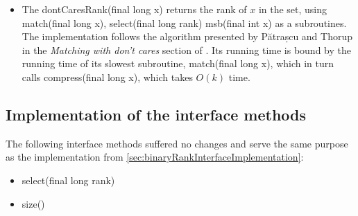 \begin{itemize}
    \item
    The {\ttfamily dontCaresRank(final long x)} returns the rank of $x$ in the set, using {\ttfamily match(final long x)}, {\ttfamily select(final long rank)} {\ttfamily msb(final int x)} as a subroutines.
    The implementation follows the algorithm presented by Pătrașcu and Thorup in the \textit{Matching with don't cares} section of \cite{patrascu2014dynamic}.
    Its running time is bound by the running time of its slowest subroutine, {\ttfamily match(final long x)}, which in turn calls {\ttfamily compress(final long x)}, which takes $O(k)$ time.

\end{itemize}

\subsection{Implementation of the interface methods} \label{sec:dontCaresRankInterfaceImplementation}

The following interface methods suffered no changes and serve the same purpose as the implementation from \ref{sec:binaryRankInterfaceImplementation}:
\begin{itemize}
    \item
    {\ttfamily select(final long rank)}
    
    \item
    {\ttfamily size()}
\end{itemize}

